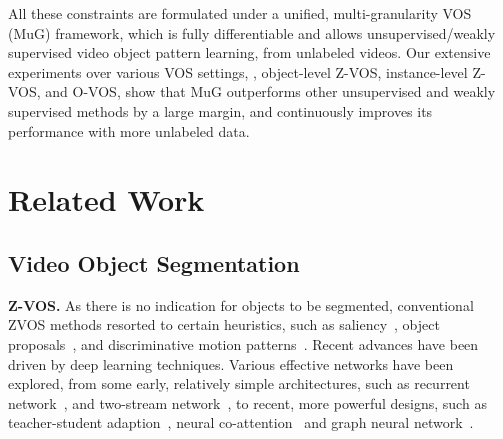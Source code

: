 \documentclass[10pt,twocolumn,letterpaper]{article}
\begin{document}
All these constraints are formulated under a unified, multi-granularity VOS (MuG) framework, which is fully differentiable and allows unsupervised/weakly supervised video object pattern learning, from unlabeled videos. Our extensive experiments over various VOS settings, \ie, object-level Z-VOS, instance-level Z-VOS, and O-VOS, show that MuG outperforms other unsupervised and weakly supervised methods by a large margin, and continuously improves its performance with more unlabeled data.









\vspace{-3pt}
\section{Related Work}
\vspace{-2pt}


\subsection{Video Object Segmentation}
\vspace{-2pt}
\noindent\textbf{Z-VOS.} As there is no indication for objects to be segmented, conventional ZVOS methods resorted to certain heuristics, such as saliency~\!\cite{DBLP:conf/cvpr/WangSP15,wang2017video,wang2015consistent,DBLP:conf/bmvc/FaktorI14}, object proposals~\!\cite{DBLP:conf/cvpr/KohK17, DBLP:conf/iccv/PerazziWGS15, lee2011key}, and discriminative motion patterns~\!\cite{DBLP:conf/iccv/OchsB11,DBLP:conf/cvpr/FragkiadakiZS12,DBLP:conf/iccv/PapazoglouF13}. Recent advances have been driven by deep learning techniques. Various effective networks have been explored, from some early, relatively simple architectures, such as
recurrent network~\!\cite{Song_2018_ECCV,pang2019deep,wang2019learning}, and two-stream network~\!\cite{cheng2017segflow,DBLP:conf/iccv/TokmakovAS17,zhou2020motion}, to recent, more powerful designs, such as teacher-student adaption~\!\cite{siam2018video}, neural co-attention~\!\cite{Lu_2019_CVPR} and graph neural network~\!\cite{wang2019zero,Yan_2019_CVPR}.
\end{document}
